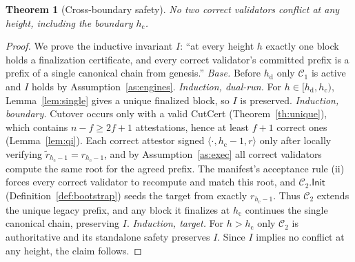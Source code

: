 \documentclass[journal]{IEEEtran}
\newtheorem{theorem}{Theorem}
\begin{document}
\begin{theorem}[Cross-boundary safety]
\label{th:safety}
No two correct validators conflict at any height, including the boundary $h_{\mathrm{c}}$.
\end{theorem}
\begin{proof}
We prove the inductive invariant $I$: ``at every height $h$ exactly one block holds a
finalization certificate, and every correct validator's committed prefix is a prefix of a
single canonical chain from genesis.'' \emph{Base.} Before $h_{\mathrm{d}}$ only $\mathcal{C}_1$
is active and $I$ holds by Assumption~\ref{as:engines}. \emph{Induction, dual-run.} For
$h\in[h_{\mathrm{d}},h_{\mathrm{c}})$, Lemma~\ref{lem:single} gives a unique finalized block, so
$I$ is preserved. \emph{Induction, boundary.} Cutover occurs only with a valid CutCert
(Theorem~\ref{th:unique}), which contains $n-f\ge 2f+1$ attestations, hence at least $f+1$
correct ones (Lemma~\ref{lem:qi}). Each correct attestor signed $\langle\cdot,h_{\mathrm{c}}-1,r\rangle$
only after locally verifying $\tilde r_{h_{\mathrm{c}}-1}=r_{h_{\mathrm{c}}-1}$, and by
Assumption~\ref{as:exec} all correct validators compute the same root for the agreed prefix.
The manifest's acceptance rule (ii) forces every correct validator to recompute and match this
root, and $\mathcal{C}_2.\mathsf{Init}$ (Definition~\ref{def:bootstrap}) seeds the target from
exactly $r_{h_{\mathrm{c}}-1}$. Thus $\mathcal{C}_2$ extends the unique legacy prefix, and any
block it finalizes at $h_{\mathrm{c}}$ continues the single canonical chain, preserving $I$.
\emph{Induction, target.} For $h>h_{\mathrm{c}}$ only $\mathcal{C}_2$ is authoritative and its
standalone safety preserves $I$. Since $I$ implies no conflict at any height, the claim
follows.
\end{proof}
\end{document}
